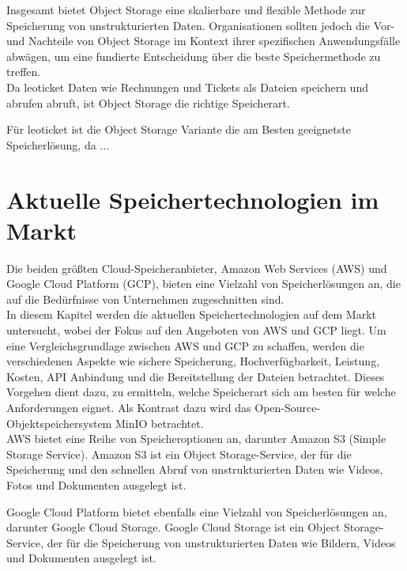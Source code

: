 Insgesamt bietet Object Storage eine skalierbare und flexible Methode zur Speicherung von unstrukturierten Daten. Organisationen sollten jedoch die Vor- und Nachteile von Object Storage im Kontext ihrer spezifischen Anwendungsfälle abwägen, um eine fundierte Entscheidung über die beste Speichermethode zu treffen.\\


Da leoticket Daten wie Rechnungen und Tickets als Dateien speichern und abrufen abruft, ist Object Storage die richtige Speicherart. 

Für leoticket ist die Object Storage Variante die am Besten geeignetste Speicherlösung, da ... %

\newpage

\section{Aktuelle Speichertechnologien im Markt}

Die beiden größten Cloud-Speicheranbieter, Amazon Web Services (AWS) und Google Cloud Platform (GCP), bieten eine Vielzahl von Speicherlösungen an, die auf die Bedürfnisse von Unternehmen zugeschnitten sind.\\ 

In diesem Kapitel werden die aktuellen Speichertechnologien auf dem Markt untersucht, wobei der Fokus auf den Angeboten von AWS und GCP liegt. Um eine Vergleichsgrundlage zwischen AWS und GCP zu schaffen, werden die verschiedenen Aspekte wie sichere Speicherung, Hochverfügbarkeit, Leistung, Kosten, API Anbindung und die Bereitstellung der Dateien betrachtet. Dieses Vorgehen dient dazu, zu ermitteln, welche Speicherart sich am besten für welche Anforderungen eignet. Als Kontrast dazu wird das Open-Source-Objektspeichersystem MinIO betrachtet.\\

AWS bietet eine Reihe von Speicheroptionen an, darunter Amazon S3 (Simple Storage Service). Amazon S3 ist ein Object Storage-Service, der für die Speicherung und den schnellen Abruf von unstrukturierten Daten wie Videos, Fotos und Dokumenten ausgelegt ist.

Google Cloud Platform bietet ebenfalls eine Vielzahl von Speicherlösungen an, darunter Google Cloud Storage. Google Cloud Storage ist ein Object Storage-Service, der für die Speicherung von unstrukturierten Daten wie Bildern, Videos und Dokumenten ausgelegt ist.\\
 
